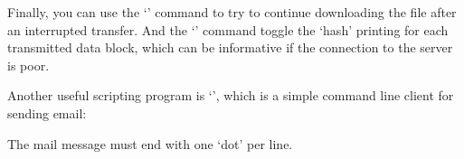 Finally, you can use the `' command to try to continue downloading
the file after an interrupted transfer. And the `' command toggle
the `hash' printing for each transmitted data block, which can be informative
if the connection to the server is poor.

Another useful scripting program is `', which is a simple command
line client for sending email:
The mail message must end with one `dot' per line.

